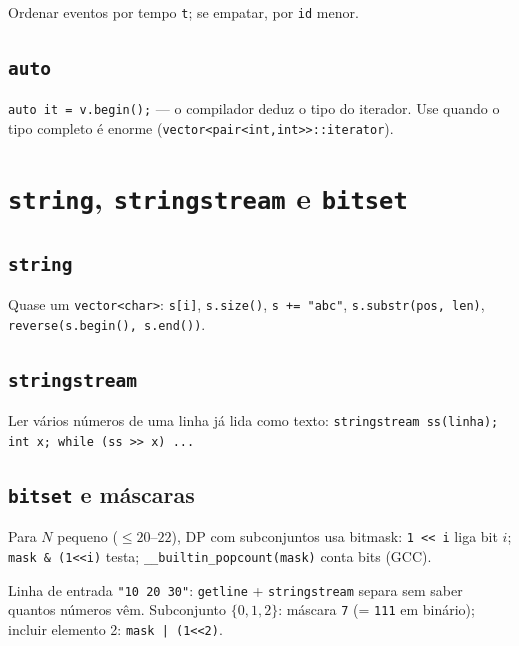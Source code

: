 Ordenar eventos por tempo \texttt{t}; se empatar, por \texttt{id} menor.

\subsection{\texttt{auto}}

\texttt{auto it = v.begin();} --- o compilador deduz o tipo do iterador. Use quando o tipo completo é enorme (\texttt{vector<pair<int,int>>::iterator}).


\section{\texttt{string}, \texttt{stringstream} e \texttt{bitset}}

\subsection{\texttt{string}}

Quase um \texttt{vector<char>}: \texttt{s[i]}, \texttt{s.size()}, \texttt{s += "abc"}, \texttt{s.substr(pos, len)}, \texttt{reverse(s.begin(), s.end())}.

\subsection{\texttt{stringstream}}

Ler vários números de uma linha já lida como texto: \texttt{stringstream ss(linha); int x; while (ss >> x) ...}

\subsection{\texttt{bitset} e máscaras}

Para $N$ pequeno ($\le 20$--$22$), DP com subconjuntos usa bitmask: \texttt{1 << i} liga bit $i$; \texttt{mask \& (1<<i)} testa; \texttt{\_\_builtin\_popcount(mask)} conta bits (GCC).

\begin{exemplodiabox}
Linha de entrada \texttt{"10 20 30"}: \texttt{getline} + \texttt{stringstream} separa sem saber quantos números vêm. Subconjunto $\{0,1,2\}$: máscara \texttt{7} (= \texttt{111} em binário); incluir elemento 2: \texttt{mask | (1<<2)}.
\end{exemplodiabox}


